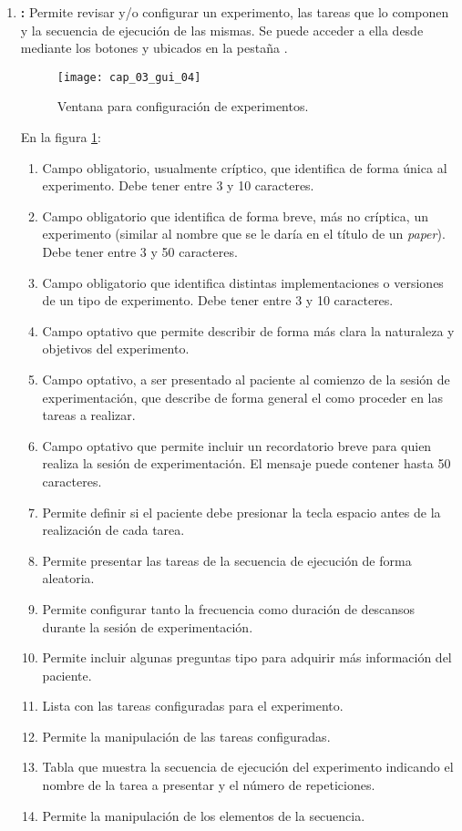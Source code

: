 \documentclass[\main/main.tex]{subfiles}
\begin{document}
\begin{enumerate}
				\item \textbf{:} Permite revisar y/o configurar un experimento, las tareas que lo componen y la secuencia de ejecución de las mismas. Se puede acceder a ella desde  mediante los botones  y  ubicados en la pestaña .
				\begin{figure}[H]
					\centering
					\texttt{[image: cap\_03\_gui\_04]}
					\caption{Ventana para configuración de experimentos.}
					\label{fig:03_gui_exp}
				\end{figure}

				\vspace{-5mm}

				En la figura \ref{fig:03_gui_exp}:
				\begin{enumerate}[(1)]\setlength\itemsep{-0.5em}
					\item Campo obligatorio, usualmente críptico, que identifica de forma única al experimento. Debe tener entre 3 y 10 caracteres.
					\item Campo obligatorio que identifica de forma breve, más no críptica, un experimento (similar al nombre que se le daría en el título de un \textit{paper}). Debe tener entre 3 y 50 caracteres.
					\item Campo obligatorio que identifica distintas implementaciones o versiones de un tipo de experimento. Debe tener entre 3 y 10 caracteres.
					\item Campo optativo que permite describir de forma más clara la naturaleza y objetivos del experimento.
					\item Campo optativo, a ser presentado al paciente al comienzo de la sesión de experimentación, que describe de forma general el como proceder en las tareas a realizar.
					\item Campo optativo que permite incluir un recordatorio breve para quien realiza la sesión de experimentación. El mensaje puede contener hasta 50 caracteres. 
					\item Permite definir si el paciente debe presionar la tecla espacio antes de la realización de cada tarea. 
					\item Permite presentar las tareas de la secuencia de ejecución de forma aleatoria.
					\item Permite configurar tanto la frecuencia como duración de descansos durante la sesión de experimentación.
					\item Permite incluir algunas preguntas tipo para adquirir más información del paciente. 
					\item Lista con las tareas configuradas para el experimento. 
					\item Permite la manipulación de las tareas configuradas.
					\item Tabla que muestra la secuencia de ejecución del experimento indicando el nombre de la tarea a presentar y el número de repeticiones. 
					\item Permite la manipulación de los elementos de la secuencia. 
				\end{enumerate}


\end{enumerate}
\end{document}
